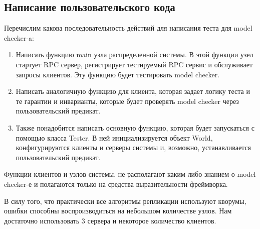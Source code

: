 \subsection{Написание пользовательского кода}

Перечислим какова последовательность действий для написания теста для model checker-a:

\begin{enumerate}
    \item Написать функцию main узла распределенной системы. В этой функции узел стартует RPC сервер, регистрирует тестируемый RPC сервис и  обслуживает запросы клиентов. Эту функцию будет тестировать model checker.
    \item Написать аналогичную функцию для клиента, которая задает логику теста и те гарантии и инварианты, которые будет проверять model checker через пользовательский предикат.
    \item Также понадобится написать основную функцию, которая будет запускаться с помощью класса Tester. В ней инициализируется объект World, конфигурируются клиенты и серверы системы и, возможно, устанавливается пользовательский предикат.
\end{enumerate}

Функции клиентов и узлов системы. не располагают каким-либо знанием о model checker-е и полагаются только на средства выразительности фреймворка.

В силу того, что практически все алгоритмы репликации используют кворумы, ошибки способны воспроизводиться на небольшом количестве узлов. Нам достаточно использовать 3 сервера и некоторое количество клиентов.
